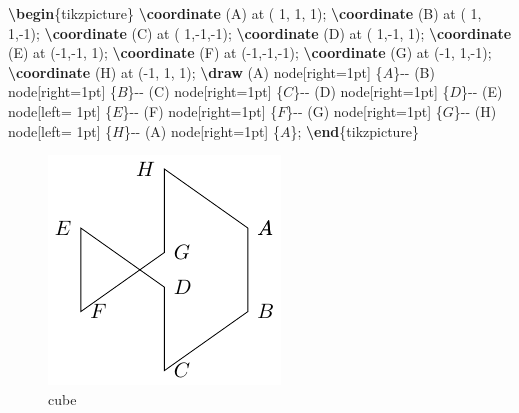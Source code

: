 \documentclass[
]{book}
\newenvironment{Shaded}{\begin{snugshade}}{\end{snugshade}}
\newcommand{\ExtensionTok}[1]{#1}
\newcommand{\FunctionTok}[1]{\textcolor[rgb]{0.13,0.29,0.53}{\textbf{#1}}}
\newcommand{\KeywordTok}[1]{\textcolor[rgb]{0.13,0.29,0.53}{\textbf{#1}}}
\newcommand{\NormalTok}[1]{#1}
\newcommand{\SpecialStringTok}[1]{\textcolor[rgb]{0.31,0.60,0.02}{#1}}
\theoremstyle{definition}
\theoremstyle{definition}
\theoremstyle{definition}
\theoremstyle{definition}
\theoremstyle{remark}
\begin{document}
\begin{Shaded}
\begin{Highlighting}[]
\KeywordTok{\textbackslash{}begin}\NormalTok{\{}\ExtensionTok{tikzpicture}\NormalTok{\}}
  \FunctionTok{\textbackslash{}coordinate}\NormalTok{ (A) at ( 1, 1, 1);}
  \FunctionTok{\textbackslash{}coordinate}\NormalTok{ (B) at ( 1, 1,{-}1);}
  \FunctionTok{\textbackslash{}coordinate}\NormalTok{ (C) at ( 1,{-}1,{-}1);}
  \FunctionTok{\textbackslash{}coordinate}\NormalTok{ (D) at ( 1,{-}1, 1);}
  \FunctionTok{\textbackslash{}coordinate}\NormalTok{ (E) at ({-}1,{-}1, 1);}
  \FunctionTok{\textbackslash{}coordinate}\NormalTok{ (F) at ({-}1,{-}1,{-}1);}
  \FunctionTok{\textbackslash{}coordinate}\NormalTok{ (G) at ({-}1, 1,{-}1);}
  \FunctionTok{\textbackslash{}coordinate}\NormalTok{ (H) at ({-}1, 1, 1);}
  \FunctionTok{\textbackslash{}draw}\NormalTok{ (A) node[right=1pt] \{}\SpecialStringTok{$A$}\NormalTok{\}{-}{-}}
\NormalTok{        (B) node[right=1pt] \{}\SpecialStringTok{$B$}\NormalTok{\}{-}{-}}
\NormalTok{        (C) node[right=1pt] \{}\SpecialStringTok{$C$}\NormalTok{\}{-}{-}}
\NormalTok{        (D) node[right=1pt] \{}\SpecialStringTok{$D$}\NormalTok{\}{-}{-}}
\NormalTok{        (E) node[left= 1pt] \{}\SpecialStringTok{$E$}\NormalTok{\}{-}{-}}
\NormalTok{        (F) node[right=1pt] \{}\SpecialStringTok{$F$}\NormalTok{\}{-}{-}}
\NormalTok{        (G) node[right=1pt] \{}\SpecialStringTok{$G$}\NormalTok{\}{-}{-}}
\NormalTok{        (H) node[left= 1pt] \{}\SpecialStringTok{$H$}\NormalTok{\}{-}{-}}
\NormalTok{        (A) node[right=1pt] \{}\SpecialStringTok{$A$}\NormalTok{\};}
\KeywordTok{\textbackslash{}end}\NormalTok{\{}\ExtensionTok{tikzpicture}\NormalTok{\}}
\end{Highlighting}
\end{Shaded}

\begin{figure}
\includegraphics[width=0.75\linewidth]{202401311000-TikZ_files/figure-latex/unnamed-chunk-63-1} \caption{cube}\label{fig:unnamed-chunk-63}
\end{figure}
\end{document}
